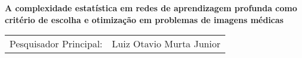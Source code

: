 \documentclass[
	12pt,				%
	openany,oneside,
	a4paper,			%
	english,			%
	brazil,				%
	]{abntex2}
\begin{document}

\frenchspacing 




\begin{center}
\textbf{\centering\Large A complexidade estatística em redes de aprendizagem profunda como critério de escolha e otimização em problemas de imagens médicas}
\end{center}

\begin{tabular}{c@{\hskip 2cm}c}
Pesquisador Principal: & Luiz Otavio Murta Junior
\end{tabular}
\end{document}
